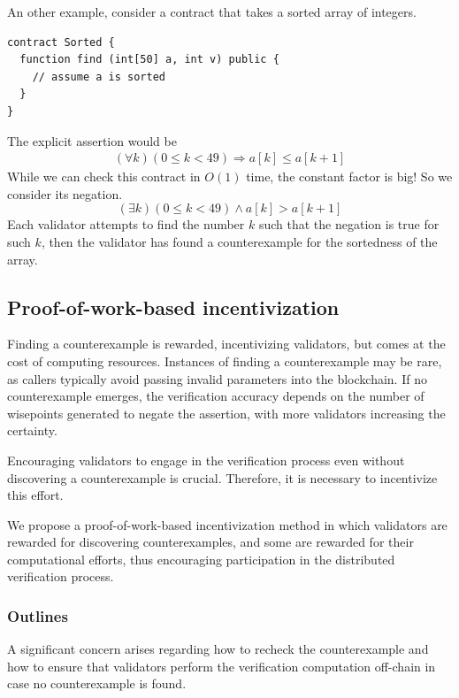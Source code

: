 \documentclass[runningheads]{llncs}
\begin{document}
An other example, consider a contract that takes a sorted array of integers.
\begin{lstlisting}[numbers=none]
contract Sorted {
  function find (int[50] a, int v) public {
    // assume a is sorted
  }
}
\end{lstlisting}
The explicit assertion would be
\begin{gather}\label{eq:1}
  (\forall k) (0\le k <49) \Rightarrow a[k] \le a[k+1]
\end{gather}
While we can check this contract in $O(1)$ time, the constant factor is big! So we
consider its negation.
\begin{displaymath}
  (\exists k) (0\le k <49) \wedge a[k] > a[k+1]
\end{displaymath}
Each validator attempts to find the number $k$ such that the negation is true for such $k$, then the validator has found a counterexample for the sortedness of the array.



\subsection{Proof-of-work-based incentivization}
Finding a counterexample is rewarded, incentivizing validators, but comes at the cost of computing resources. Instances of finding a counterexample may be rare, as callers typically avoid passing invalid parameters into the blockchain. If no counterexample emerges, the verification accuracy depends on the number of wisepoints generated to negate the assertion, with more validators increasing the certainty. 

Encouraging validators to engage in the verification process even without discovering a counterexample is crucial. Therefore, it is necessary to incentivize this effort. %

We propose a proof-of-work-based incentivization method in which validators are rewarded for discovering counterexamples, and some are rewarded for their computational efforts, thus encouraging participation in the distributed verification process.
\subsubsection{Outlines}
A significant concern arises regarding how to recheck the counterexample and how to ensure that validators perform the verification computation off-chain in case no counterexample is found.
\end{document}
